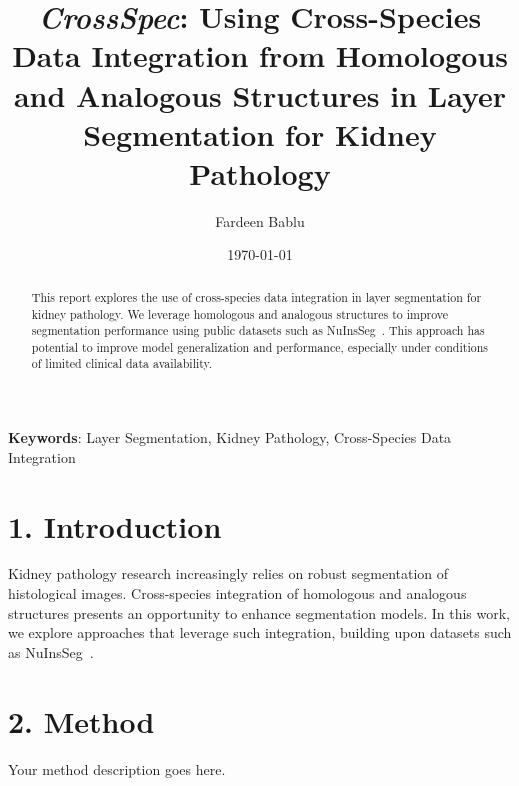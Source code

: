 \documentclass[11pt]{article}
\title{\bfseries\Large \textit{CrossSpec}: Using Cross-Species Data Integration from Homologous and Analogous Structures in Layer Segmentation for Kidney Pathology}
\author[1]{Fardeen Bablu}
\affil[1]{Department of Computer Science, Vanderbilt University, Nashville, TN, USA \\ \texttt{fardeen.bablu@vanderbilt.edu}}
\date{\today}
\begin{document}
\maketitle

\begin{abstract}
\noindent
This report explores the use of cross-species data integration in layer segmentation for kidney pathology. We leverage homologous and analogous structures to improve segmentation performance using public datasets such as NuInsSeg~\cite{mahbod2023nuinsseg}. This approach has potential to improve model generalization and performance, especially under conditions of limited clinical data availability.
\end{abstract}

\textbf{Keywords}: Layer Segmentation, Kidney Pathology, Cross-Species Data Integration

\section*{1. Introduction}
\noindent
Kidney pathology research increasingly relies on robust segmentation of histological images. Cross-species integration of homologous and analogous structures presents an opportunity to enhance segmentation models. In this work, we explore approaches that leverage such integration, building upon datasets such as NuInsSeg~\cite{mahbod2023nuinsseg}.

\section*{2. Method}
\noindent
Your method description goes here.




\end{document}
